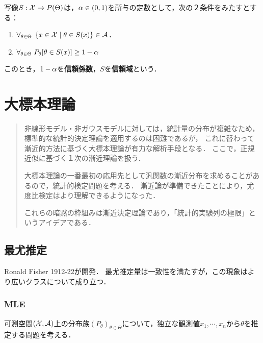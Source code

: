 \documentclass[uplatex,dvipdfmx]{jsreport}
\begin{document}
\begin{definition}
    写像$S:\mathcal{X}\to P(\Theta)$は，$\alpha\in(0,1)$を所与の定数として，次の２条件をみたすとする：
    \begin{enumerate}
        \item $\forall_{\theta\in\Theta}\;\left\{x\in\mathcal{X}\mid \theta\in S(x)\right\}\in\mathcal{A}$．
        \item $\forall_{\theta\in\Theta}\;P_\theta[\theta\in S(x)]\ge1-\alpha$
    \end{enumerate}
    このとき，$1-\alpha$を\textbf{信頼係数}，$S$を\textbf{信頼域}という．
\end{definition}

\chapter{大標本理論}

\begin{quotation}
    非線形モデル・非ガウスモデルに対しては，統計量の分布が複雑なため，標準的な統計的決定理論を適用するのは困難であるが，
    これに替わって漸近的方法に基づく大標本理論が有力な解析手段となる．
    ここで，正規近似に基づく１次の漸近理論を扱う．

    大標本理論の一番最初の応用先として汎関数の漸近分布を求めることがあるので，統計的検定問題を考える．
    漸近論が準備できたことにより，尤度比検定はより理解できるようになった．

    これらの暗黙の枠組みは漸近決定理論であり，「統計的実験列の極限」というアイデアである．
\end{quotation}

\section{最尤推定}

\begin{tcolorbox}[colframe=ForestGreen, colback=ForestGreen!10!white,breakable,colbacktitle=ForestGreen!40!white,coltitle=black,fonttitle=\bfseries\sffamily,
title=]
    Ronald Fisher 1912-22が開発．
    最尤推定量は一致性を満たすが，この現象はより広いクラスについて成り立つ．
\end{tcolorbox}

\subsection{MLE}

\begin{problem}
    可測空間$(\mathcal{X},\mathcal{A})$上の分布族$(P_\theta)_{\theta\in\Theta}$について，独立な観測値$x_1,\cdots,x_n$から$\theta$を推定する問題を考える．
\end{problem}
\end{document}
